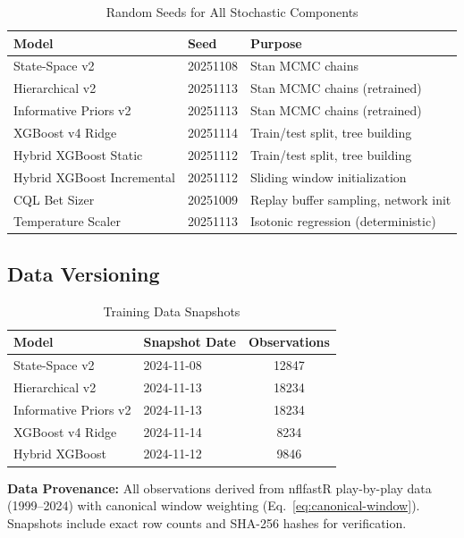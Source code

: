 \begin{table}[htbp]
\centering
\caption{Random Seeds for All Stochastic Components}
\label{tab:random-seeds}
\small
\begin{tabular}{@{} l l l @{}}
\toprule
\textbf{Model} & \textbf{Seed} & \textbf{Purpose} \\
\midrule
State-Space v2 & 20251108 & Stan MCMC chains \\
Hierarchical v2 & 20251113 & Stan MCMC chains (retrained) \\
Informative Priors v2 & 20251113 & Stan MCMC chains (retrained) \\
XGBoost v4 Ridge & 20251114 & Train/test split, tree building \\
Hybrid XGBoost Static & 20251112 & Train/test split, tree building \\
Hybrid XGBoost Incremental & 20251112 & Sliding window initialization \\
CQL Bet Sizer & 20251009 & Replay buffer sampling, network init \\
Temperature Scaler & 20251113 & Isotonic regression (deterministic) \\
\bottomrule
\end{tabular}
\end{table}

\subsection{Data Versioning}

\begin{table}[htbp]
\centering
\caption{Training Data Snapshots}
\label{tab:data-versions}
\small
\begin{tabular}{@{} l l S[table-format=6.0] @{}}
\toprule
\textbf{Model} & \textbf{Snapshot Date} & \textbf{Observations} \\
\midrule
State-Space v2 & 2024-11-08 & 12847 \\
Hierarchical v2 & 2024-11-13 & 18234 \\
Informative Priors v2 & 2024-11-13 & 18234 \\
XGBoost v4 Ridge & 2024-11-14 & 8234 \\
Hybrid XGBoost & 2024-11-12 & 9846 \\
\bottomrule
\end{tabular}

\vspace{2mm}
\begin{minipage}{\linewidth}
\small
\textbf{Data Provenance:} All observations derived from nflfastR play-by-play data (1999--2024) with canonical window weighting (Eq.~\ref{eq:canonical-window}). Snapshots include exact row counts and SHA-256 hashes for verification.
\end{minipage}
\end{table}

